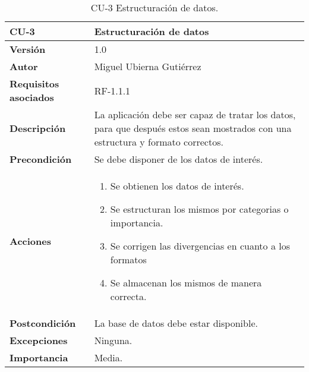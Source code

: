\begin{table}[p]
	\centering
	\begin{tabularx}{\linewidth}{ p{} p{} }
		\toprule
		\textbf{CU-3}    & \textbf{Estructuración de datos}\\
		\toprule
		\textbf{Versión}              & 1.0    \\
		\textbf{Autor}                & Miguel Ubierna Gutiérrez \\
		\textbf{Requisitos asociados} & RF-1.1.1 \\
		\textbf{Descripción}          & La aplicación debe ser capaz de tratar los datos, para que después estos sean mostrados con una estructura y formato correctos. \\
		\textbf{Precondición}         & Se debe disponer de los datos de interés. \\
		\textbf{Acciones}             &
		\begin{enumerate}
			\def\labelenumi{\arabic{enumi}.}
			\tightlist
			\item Se obtienen los datos de interés.
			\item Se estructuran los mismos por categorias o importancia.
                \item Se corrigen las divergencias en cuanto a los formatos
                \item Se almacenan los mismos de manera correcta.
		\end{enumerate}\\
		\textbf{Postcondición}        & La base de datos debe estar disponible. \\
		\textbf{Excepciones}          & Ninguna.  \\
		\textbf{Importancia}          & Media.  \\
		\bottomrule
	\end{tabularx}
	\caption{CU-3 Estructuración de datos.}
\end{table}

